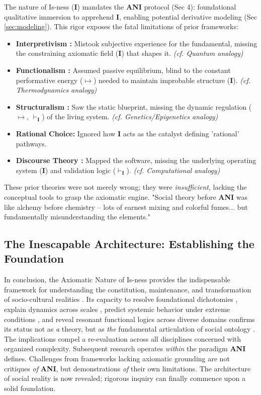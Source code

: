 \documentclass{article}
\newcommand{\ANI}{\textbf{ANI}}             %
\newcommand{\Isness}{\mathbf{I}}            %
\newcommand{\enactment}{\ensuremath{\mapsto}} %
\newcommand{\validates}[1]{\ensuremath{\vdash_{#1}}} %
\begin{document}
The nature of Is-ness ($\Isness$) mandates the \ANI{} protocol (Sec 4): foundational qualitative immersion \citep{Geertz1973, DenzinLincoln2011} to apprehend $\Isness$, enabling potential derivative modeling (Sec \ref{sec:modeling}). This rigor exposes the fatal limitations of prior frameworks:
\begin{itemize}
    \item \textbf{Interpretivism \citep{Geertz1973}:} Mistook subjective experience for the fundamental, missing the constraining axiomatic field ($\Isness$) that shapes it. \textit{(cf. Quantum analogy)}
    \item \textbf{Functionalism \citep{Parsons1951}:} Assumed passive equilibrium, blind to the constant performative energy ($\enactment$) needed to maintain improbable structure ($\Isness$). \textit{(cf. Thermodynamics analogy)}
    \item \textbf{Structuralism \citep{LeviStrauss1969}:} Saw the static blueprint, missing the dynamic regulation ($\enactment$, $\validates{\Isness}$) of the living system. \textit{(cf. Genetics/Epigenetics analogy)}
    \item \textbf{Rational Choice:} Ignored how $\Isness$ acts as the catalyst defining 'rational' pathways.
    \item \textbf{Discourse Theory \citep{Foucault1972}:} Mapped the software, missing the underlying operating system ($\Isness$) and validation logic ($\validates{\Isness}$). \textit{(cf. Computational analogy)}
\end{itemize}
These prior theories were not merely wrong; they were \textit{insufficient}, lacking the conceptual tools to grasp the axiomatic engine. "Social theory before \ANI{} was like alchemy before chemistry – lots of earnest mixing and colorful fumes... but fundamentally misunderstanding the elements."

\subsection{The Inescapable Architecture: Establishing the Foundation}

In conclusion, the Axiomatic Nature of Is-ness provides the indispensable framework for understanding the constitution, maintenance, and transformation of socio-cultural realities \citep{BergerLuckmann1966}. Its capacity to resolve foundational dichotomies \citep{Giddens1984}, explain dynamics across scales \citep{Luhmann1995}, predict systemic behavior under extreme conditions \citep{Arendt1951}, and reveal resonant functional logics across diverse domains \citep{Bateson1972} confirms its status not as \textit{a} theory, but as \textit{the} fundamental articulation of social ontology \citep{Searle1995}. The implications compel a re-evaluation across all disciplines concerned with organized complexity. Subsequent research operates \textit{within} the paradigm \ANI{} defines. Challenges from frameworks lacking axiomatic grounding are not critiques \textit{of} \ANI{}, but demonstrations \textit{of} their own limitations. The architecture of social reality is now revealed; rigorous inquiry can finally commence upon a solid foundation.
\end{document}
